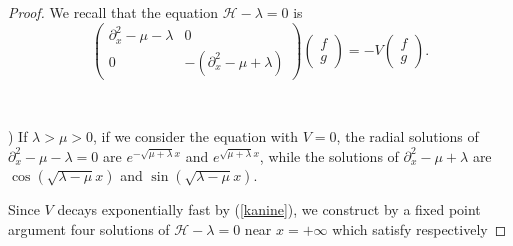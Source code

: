 \documentclass[11 pt]{amsart}
\theoremstyle{definition}
\theoremstyle{remark}
\numberwithin{equation}{section}
\begin{document}
\begin{proof}
  We recall that the equation $\mathcal{H}- \lambda = 0$ is
  \[ \left(\begin{array}{cc}
       \partial_x^2 - \mu - \lambda & 0\\
       0 & - (\partial_x^2 - \mu + \lambda)
     \end{array}\right) \left(\begin{array}{c}
       f\\
       g
     \end{array}\right) = - V \left(\begin{array}{c}
       f\\
       g
     \end{array}\right) . \]
  
  \
  
) If $\lambda > \mu > 0$, if we consider the equation with $V = 0$, the
  radial solutions of $\partial_x^2 - \mu - \lambda = 0$ are $e^{-\sqrt{\mu + \lambda} x} $ and $e^{\sqrt{\mu + \lambda} x} $, while the solutions of $\partial_x^2 - \mu +
  \lambda$ are $\cos \left( \sqrt{\lambda - \mu } x \right)$ and
  $\sin \left( \sqrt{\lambda - \mu } x \right)$.
  
  Since $V$ decays exponentially fast by (\ref{kanine}), we construct by a
  fixed point argument four solutions of $\mathcal{H}- \lambda = 0$ near $x =
  + \infty$ which satisfy respectively


\end{proof}
\end{document}
